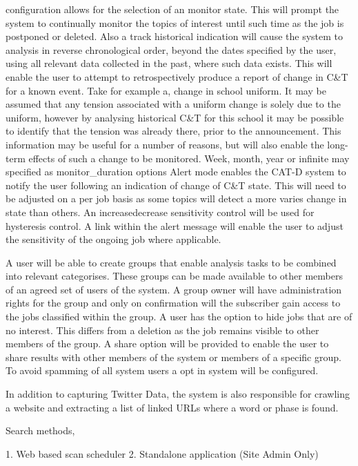 configuration allows for the selection of an monitor state. This will prompt the system to continually monitor the topics of interest until such time as the job is postponed or deleted. Also a track historical indication will cause the system to analysis in reverse chronological order, beyond the dates specified by the user, using all relevant data collected in the past, where such data exists. This will enable the user to attempt to retrospectively produce a report of change in C\&T for a known event. Take for example a, change in school uniform. It may be assumed that any tension associated with a uniform change is solely due to the uniform, however by analysing historical C\&T for this school it may be possible to identify that the tension was already there, prior to the announcement. This information may be useful for a number of reasons, but will also enable the long-\/term effects of such a change to be monitored. Week, month, year or infinite may specified as monitor\+\_\+duration options Alert mode enables the C\+A\+T-\/\+D system to notify the user following an indication of change of C\&T state. This will need to be adjusted on a per job basis as some topics will detect a more varies change in state than others. An increasedecrease sensitivity control will be used for hysteresis control. A link within the alert message will enable the user to adjust the sensitivity of the ongoing job where applicable.

A user will be able to create groups that enable analysis tasks to be combined into relevant categorises. These groups can be made available to other members of an agreed set of users of the system. A group owner will have administration rights for the group and only on confirmation will the subscriber gain access to the jobs classified within the group. A user has the option to hide jobs that are of no interest. This differs from a deletion as the job remains visible to other members of the group. A share option will be provided to enable the user to share results with other members of the system or members of a specific group. To avoid spamming of all system users a opt in system will be configured.

\begin{DoxyVerb}In addition to capturing Twitter Data, the system is also responsible for crawling a website and extracting a list of linked URLs where a word or phase is found.

Search methods,

    1. Web based scan scheduler 
    2. Standalone application (Site Admin Only)
\end{DoxyVerb}



